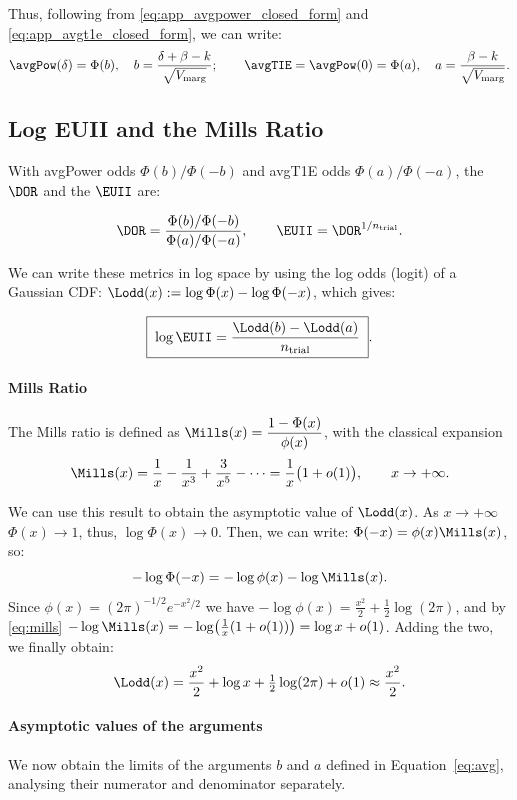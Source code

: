 Thus, following from \eqref{eq:app_avgpower_closed_form} and \eqref{eq:app_avgt1e_closed_form}, we can write:
\begin{equation}\label{eq:avg}
  \avgPow(\delta)=\Phi(b),\quad b=\frac{\delta+\beta-k}{\sqrt{V_{\mathrm{marg}}}};\qquad
  \avgTIE=\avgPow(0)=\Phi(a),\quad a=\frac{\beta-k}{\sqrt{V_{\mathrm{marg}}}} .
\end{equation}


\subsection{Log EUII and the Mills Ratio}
With avgPower odds $\Phi(b)/\Phi(-b)$ and avgT1E odds $\Phi(a)/\Phi(-a)$, the $\DOR$ and the $\EUII$ are:

\[
  \DOR=\frac{\Phi(b)/\Phi(-b)}{\Phi(a)/\Phi(-a)},\qquad
  \EUII=\DOR^{1/n_{\mathrm{trial}}} .
\]

We can write these metrics in log space by using the log odds (logit) of a Gaussian CDF:
$\Lodd(x):=\log\Phi(x)-\log\Phi(-x)$, which gives: 

\begin{equation}\label{eq:logeuii}
  \boxed{\;\log\EUII=\frac{\Lodd(b)-\Lodd(a)}{n_{\mathrm{trial}}}\;}.
\end{equation}


\paragraph{Mills Ratio}
The Mills ratio is defined as $\Mills(x)=\dfrac{1-\Phi(x)}{\phi(x)}$, with the classical
expansion
\begin{equation}\label{eq:mills}
  \Mills(x)=\frac1x-\frac1{x^3}+\frac{3}{x^5}-\cdots=\frac1x\bigl(1+o(1)\bigr),
  \qquad x\to+\infty .
\end{equation}

We can use this result to obtain the asymptotic value of $\Lodd(x)$.
As $x\to+\infty$ $\Phi(x) \to 1$, thus, $\log \Phi(x) \to 0$. Then, we can write:
$\Phi(-x) = \phi(x) \Mills(x)$, so:
\[
  -\log\Phi(-x) =-\log\phi(x)-\log \Mills(x).
\]
Since $\phi(x)=(2\pi)^{-1/2}e^{-x^2/2}$ we have $-\log\phi(x)=\tfrac{x^2}{2}+\tfrac12\log(2\pi)$,
and by \eqref{eq:mills} $-\log\Mills(x)=-\log\!\big(\tfrac1x(1+o(1))\big)=\log x+o(1)$.
Adding the two, we finally obtain:
\[
  \Lodd(x)=\frac{x^2}{2}+\log x+\tfrac12\log(2\pi)+o(1) \approx \frac{x^2}{2}.
\]

 
\paragraph{Asymptotic values of the arguments}
We now obtain the limits of the arguments $b$ and $a$ defined in Equation~\eqref{eq:avg}, analysing their numerator and denominator separately.

